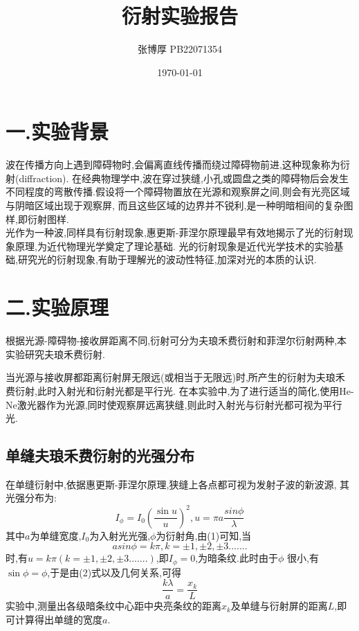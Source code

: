 \documentclass[12pt,a4paper,oneside]{ctexart}
\title{衍射实验报告}
\author{张博厚 PB22071354}
\date{\today}
\newcommand\specialsectioning{\par
  \setcounter{section}{0}%
  \setcounter{subsection}{0}%
  \renewcommand\thesection{\relax}}
\begin{document}
\specialsectioning
\maketitle
\tableofcontents
\newpage
\section{一.实验背景}
波在传播方向上遇到障碍物时,会偏离直线传播而绕过障碍物前进,这种现象称为衍射(diffraction).
在经典物理学中,波在穿过狭缝,小孔或圆盘之类的障碍物后会发生不同程度的弯散传播.假设将一个障碍物置放在光源和观察屏之间,则会有光亮区域与阴暗区域出现于观察屏,
而且这些区域的边界并不锐利,是一种明暗相间的复杂图样,即衍射图样.\\ \indent
光作为一种波,同样具有衍射现象,惠更斯-菲涅尔原理最早有效地揭示了光的衍射现象原理,为近代物理光学奠定了理论基础.
光的衍射现象是近代光学技术的实验基础,研究光的衍射现象,有助于理解光的波动性特征,加深对光的本质的认识.
\section{二.实验原理}
根据光源-障碍物-接收屏距离不同,衍射可分为夫琅禾费衍射和菲涅尔衍射两种,本实验研究夫琅禾费衍射.\par
当光源与接收屏都距离衍射屏无限远(或相当于无限远)时,所产生的衍射为夫琅禾费衍射,此时入射光和衍射光都是平行光.
在本实验中,为了进行适当的简化,使用He-Ne激光器作为光源,同时使观察屏远离狭缝,则此时入射光与衍射光都可视为平行光.\\
\subsection*{单缝夫琅禾费衍射的光强分布}\par
在单缝衍射中,依据惠更斯-菲涅尔原理,狭缝上各点都可视为发射子波的新波源,
其光强分布为:
\begin{equation}
    I_{\phi}=I_0\left(\frac{\sin u}{u}\right)^2,u=\pi a\frac{sin\phi}{\lambda}
\end{equation}
其中$a$为单缝宽度,$I_0$为入射光光强,$\phi$为衍射角,由(1)可知,当
\begin{equation}
    asin\phi=k\pi,k=\pm 1,\pm2,\pm3.......
\end{equation}
时,有$u=k\pi(k=\pm 1,\pm2,\pm3.......)$,即$I_{\phi}=0$,为暗条纹.此时由于$\phi$
很小,有$\sin\phi=\phi$,于是由(2)式以及几何关系,可得
\begin{equation}
    \frac{k\lambda}{a}=\frac{x_k}{L}
\end{equation}
实验中,测量出各级暗条纹中心距中央亮条纹的距离$x_k$及单缝与衍射屏的距离$L$,即可计算得出单缝的宽度$a$.\\
\end{document}
